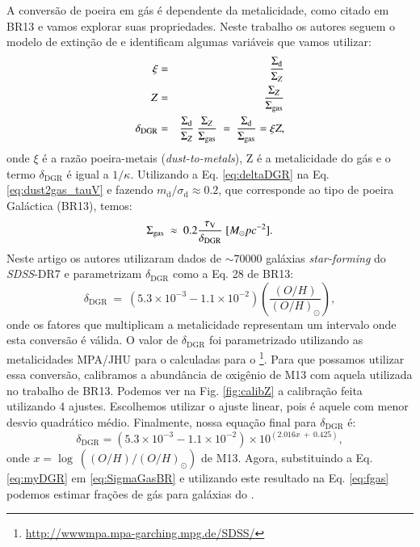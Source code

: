 A conversão de poeira em gás é dependente da metalicidade, como citado em BR13 e vamos explorar suas
propriedades. Neste trabalho os autores seguem o modelo de extinção de \citet{Charlot.Fall.2000a} e
identificam algumas variáveis que vamos utilizar:
\begin{eqnarray}
	\xi &=& \frac{\Sigma_{\mathrm{d}}}{\Sigma_Z} \\
	Z &=& \frac{\Sigma_Z}{\SigmaGas}  \\
	\delta_{\mathrm{DGR}} &=& \frac{\Sigma_{\mathrm{d}}}{\Sigma_Z}\	\frac{\Sigma_Z}{\SigmaGas}\ =\ \frac{\Sigma_{\mathrm{d}}}{\SigmaGas} = \xi Z,
	\label{eq:deltaDGR}
\end{eqnarray}
\noindent onde $\xi$ é a razão poeira-metais ({\em dust-to-metals}), Z é a metalicidade do gás e o
termo $\delta_{\mathrm{DGR}}$ é igual a $1/\kappa$. Utilizando a Eq. \ref{eq:deltaDGR} na Eq.
\ref{eq:dust2gas_tauV} e fazendo $m_{\mathrm{d}}/\sigma_{\mathrm{d}} \approx 0.2$, que corresponde
ao tipo de poeira Galáctica (BR13), temos:
\begin{equation}
	\Sigma_{\mathrm{gas}}\ \approx\ 0.2 \frac{\tau_{\mathrm{V}}}{\delta_{\mathrm{DGR}}}\ [M_\odot pc^{-2}].
	\label{eq:SigmaGasBR}
\end{equation}
Neste artigo os autores utilizaram dados de $\sim 70000$ galáxias {\em star-forming} do
\textit{SDSS}-DR7 e parametrizam $\delta_{\mathrm{DGR}}$ como a Eq. 28 de BR13:
\begin{equation}
	\delta_{\mathrm{DGR}}\ =\ (5.3 \times 10^{-3} - 1.1 \times 10^{-2})
\left(\frac{(O/H)}{(O/H)_\odot}\right),
	\label{eq:DGR_brinch_eq28}
\end{equation}
\noindent onde os fatores que multiplicam a metalicidade representam um intervalo onde esta
conversão é válida. O valor de $\delta_{\mathrm{DGR}}$ foi parametrizado utilizando as metalicidades
MPA/JHU para o calculadas para o
\SDSS\footnote{\href{http://wwwmpa.mpa-garching.mpg.de/SDSS/}{http://wwwmpa.mpa-garching.mpg.de/SDSS/}}.
Para que possamos utilizar essa conversão, calibramos a abundância de oxigênio de M13 com aquela
utilizada no trabalho de BR13. Podemos ver na Fig. \ref{fig:calibZ} a calibração feita utilizando 4
ajustes. Escolhemos utilizar o ajuste linear, pois é aquele com menor desvio quadrático médio.
Finalmente, nossa equação final para $\delta_{\mathrm{DGR}}$ é:
\begin{equation}
	\delta_{\mathrm{DGR}} =  (5.3 \times 10^{-3} - 1.1 \times 10^{-2}) \times 10^{\left(2.016 x\ +\ 0.425\right)},
	\label{eq:myDGR}
\end{equation}
\noindent onde $x = \log\ ((O/H)/(O/H)_\odot)$ de M13. Agora, substituindo a Eq. \ref{eq:myDGR} em
\ref{eq:SigmaGasBR} e utilizando este resultado na Eq. \ref{eq:fgas} podemos estimar frações de
gás para galáxias do \CAL.

